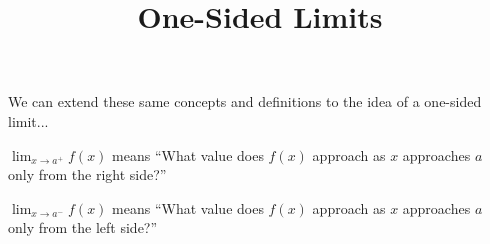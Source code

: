 \documentclass{ximera}
\title{One-Sided Limits}
\begin{document}
\maketitle

We can extend these same concepts and definitions to the idea of a one-sided limit...

$\lim_{x \to a^+} f(x)$ means ``What value does $f(x)$ approach as $x$ approaches $a$ only from the right side?''

$\lim_{x \to a^-} f(x)$ means ``What value does $f(x)$ approach as $x$ approaches $a$ only from the left side?''
\end{document}
